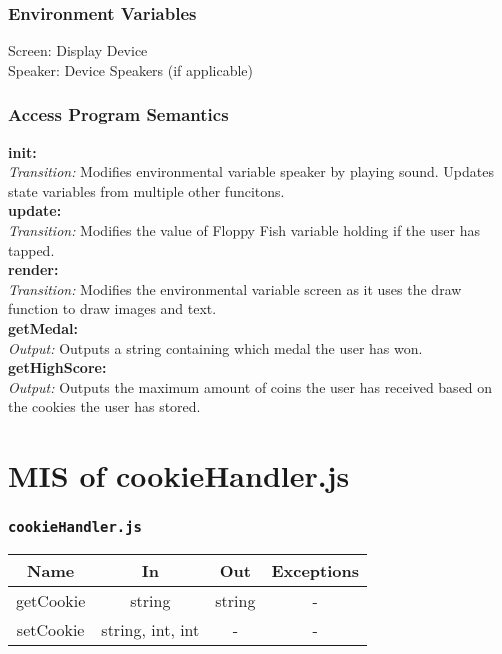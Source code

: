 \documentclass[11pt, oneside]{article}   	%
\begin{document}
\subsubsection*{Environment Variables}
Screen: Display Device\\
Speaker: Device Speakers (if applicable)\\

\subsubsection*{Access Program Semantics} 
 \textbf{init:}  \\
 \textit{Transition:} Modifies environmental variable speaker by playing sound. Updates state variables from multiple other funcitons.\\
 \textbf{update:}  \\
 \textit{Transition:} Modifies the value of Floppy Fish variable holding if the user has tapped.\\
 \textbf{render:}  \\
 \textit{Transition:} Modifies the environmental variable screen as it uses the draw function to draw images and text.\\
 \textbf{getMedal:}  \\
 \textit{Output:} Outputs a string containing which medal the user has won.\\
 \textbf{getHighScore:}  \\
 \textit{Output:} Outputs the maximum amount of coins the user has received based on the cookies the user has stored.\\



\section*{MIS of cookieHandler.js}
\subsubsection*{\texttt{cookieHandler.js}}



\begin{center}
\begin{tabular}{ |c|c|c|c| } 
 \hline
 Name & In & Out & Exceptions \\ 
 \hline \hline
 getCookie & string & string & - \\ 
 setCookie & string, int, int & - & - \\ 
 \hline
\end{tabular}
\end{center}
\end{document}
